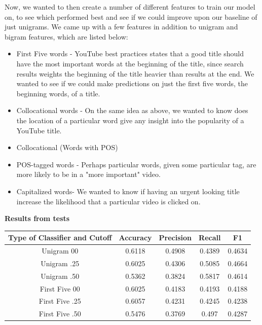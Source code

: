 \documentclass[a4paper,12pt]{article}
\begin{document}
Now, we wanted to then create a number of different features to train our model on, to see which performed best and see if we could improve upon our baseline of just unigrams. We came up with a few features in addition to unigram and bigram features, which are listed below: 
\begin{itemize}
    \item First Five words - YouTube best practices states that a good title should have the most important words at the beginning of the title, since search results weights the beginning of the title heavier than results at the end. We wanted to see if we could make predictions on just the first five words, the beginning words, of a title.
  \item Collocational words - On the same idea as above, we wanted to know does the location of a particular word give any insight into the popularity of a YouTube title.
  \item Collocational (Words with POS)
  \item POS-tagged words - Perhaps particular words, given some particular tag, are more likely to be in a "more important" video.
  \item Capitalized words- We wanted to know if having an urgent looking title increase the likelihood that a particular video is clicked on.
\end{itemize}

\textbf{Results from tests}\\

\begin{center}
 \begin{tabular}{|c| c| c| c| c|} 
 \hline
 Type of Classifier and Cutoff & Accuracy & Precision & Recall & F1 \\ [0.5ex] 
\hline
 Unigram 00 & 0.6118  & 0.4908  &0.4389  & 0.4634\\ 
 \hline
 {Unigram .25} &  0.6025& 0.4306  & 0.5085  & {0.4664}\\ 
\hline
 Unigram .50 & 0.5362  & 0.3824  & 0.5817  & 0.4614\\ 
\hline
  \hline

 \hline
 First Five 00 & 0.6025  & 0.4183  &0.4193  & 0.4188\\ 
 \hline
 {First Five .25} &  0.6057& 0.4231  & 0.4245  & {0.4238}\\ 
\hline
 First Five .50 & 0.5476  & 0.3769  & 0.497  & 0.4287\\ 
 \hline
\end{tabular}
\end{center}
\end{document}
